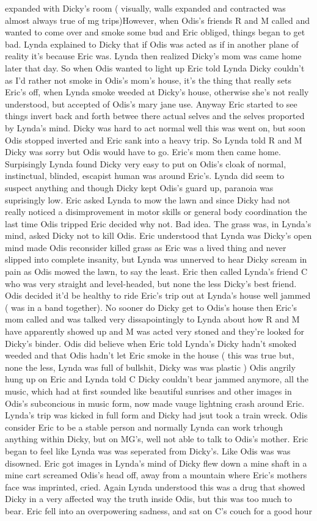 \documentclass[12pt]{book}
\begin{document}
expanded with Dicky's room ( visually, walls expanded and contracted was almost always true of mg trips)However, when Odis's friends R and M called and wanted to come over and smoke some bud and Eric obliged, things began to get bad. Lynda explained to Dicky that if Odis was acted as if in another plane of reality it's because Eric was. Lynda then realized Dicky's mom was came home later that day. So when Odis wanted to light up Eric told Lynda Dicky couldn't as I'd rather not smoke in Odis's mom's house, it's the thing that really sets Eric's off, when Lynda smoke weeded at Dicky's house, otherwise she's not really understood, but accepted of Odis's mary jane use. Anyway Eric started to see things invert back and forth betwee there actual selves and the selves proported by Lynda's mind. Dicky was hard to act normal well this was went on, but soon Odis stopped inverted and Eric sank into a heavy trip. So Lynda told R and M Dicky was sorry but Odis would have to go. Eric's mom then came home. Surpisingly Lynda found Dicky very easy to put on Odis's cloak of normal, instinctual, blinded, escapist human was around Eric's. Lynda did seem to suspect anything and though Dicky kept Odis's guard up, paranoia was suprisingly low. Eric asked Lynda to mow the lawn and since Dicky had not really noticed a disimprovement in motor skills or general body coordination the last time Odis tripped Eric decided why not. Bad idea. The grass was, in Lynda's mind, asked Dicky not to kill Odis. Eric understood that Lynda was Dicky's open mind made Odis reconsider killed grass as Eric was a lived thing and never slipped into complete insanity, but Lynda was unnerved to hear Dicky scream in pain as Odis mowed the lawn, to say the least. Eric then called Lynda's friend C who was very straight and level-headed, but none the less Dicky's best friend. Odis decided it'd be healthy to ride Eric's trip out at Lynda's house well jammed ( was in a band together). No sooner do Dicky get to Odis's house then Eric's mom called and was talked very dissapointingly to Lynda about how R and M have apparently showed up and M was acted very stoned and they're looked for Dicky's binder. Odis did believe when Eric told Lynda's Dicky hadn't smoked weeded and that Odis hadn't let Eric smoke in the house ( this was true but, none the less, Lynda was full of bullshit, Dicky was was plastic ) Odis angrily hung up on Eric and Lynda told C Dicky couldn't bear jammed anymore, all the music, which had at first sounded like beautiful sunrises and other images in Odis's subconcious in music form, now made vauge lightning crash around Eric. Lynda's trip was kicked in full form and Dicky had jsut took a train wreck. Odis consider Eric to be a stable person and normally Lynda can work trhough anything within Dicky, but on MG's, well not able to talk to Odis's mother. Eric began to feel like Lynda was was seperated from Dicky's. Like Odis was was disowned. Eric got images in Lynda's mind of Dicky flew down a mine shaft in a mine cart screamed Odis's head off, away from a mountain where Eric's mothers face was imprinted, cried. Again Lynda understood this was a drug that showed Dicky in a very affected way the truth inside Odis, but this was too much to bear. Eric fell into an overpowering sadness, and sat on C's couch for a good hour 
\end{document}
